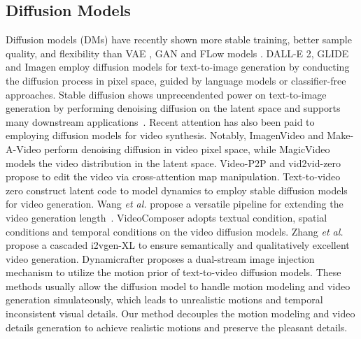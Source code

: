 \documentclass[10pt,twocolumn,letterpaper]{article}
\begin{document}
\subsection{Diffusion Models}
Diffusion models (DMs) \cite{ho2020denoising,song2021denoising} have recently shown more stable training, better sample quality, and flexibility than VAE \cite{VAE}, GAN \cite{GAN} and FLow models \cite{flow_models}. DALL-E 2\cite{DALL-E}, GLIDE \cite{glide} and Imagen \cite{Imagen} employ diffusion models for text-to-image generation by conducting the diffusion process in pixel space, guided by language models \cite{Clip,T5} or classifier-free approaches. Stable diffusion \cite{rombach2021highresolution} shows unprecendented power on text-to-image generation by performing denoising diffusion on the latent space and supports many downstream applications~\cite{zhang2023unified,zhang2023kbnet}.
\newline
\noindent Recent attention has also been paid to employing diffusion models \cite{rombach2021highresolution} for video synthesis. 
Notably, ImagenVideo \cite{Ho2022ImagenVH} and Make-A-Video \cite{singer2022makeavideo} perform denoising diffusion in video pixel space, while MagicVideo \cite{zhou2023magicvideo} models the video distribution in the latent space. 
Video-P2P \cite{liu2023videop2p} and vid2vid-zero \cite{vid2vid-zero} propose to edit the video via cross-attention map manipulation. Text-to-video zero \cite{text2video-zero} construct latent code to model dynamics to employ stable diffusion models \cite{rombach2021highresolution} for video generation. Wang \textit{et al.} propose a versatile pipeline for extending the video generation length~\cite{wang2023gen}. VideoComposer \cite{2023videocomposer} adopts textual condition, spatial conditions and temporal conditions on the video diffusion models. Zhang \textit{et al.} propose a cascaded i2vgen-XL \cite{2023i2vgenxl} to ensure semantically and qualitatively excellent video generation. Dynamicrafter \cite{xing2023dynamicrafter} proposes a dual-stream image injection mechanism to utilize the motion prior of text-to-video diffusion models. These methods \cite{2023videocomposer, xing2023dynamicrafter, 2023i2vgenxl} usually allow the diffusion model to handle motion modeling and video generation simulateously, which leads to unrealistic motions and temporal inconsistent visual details. Our method decouples the motion modeling and video details generation to achieve realistic motions and preserve the pleasant details.
\end{document}
